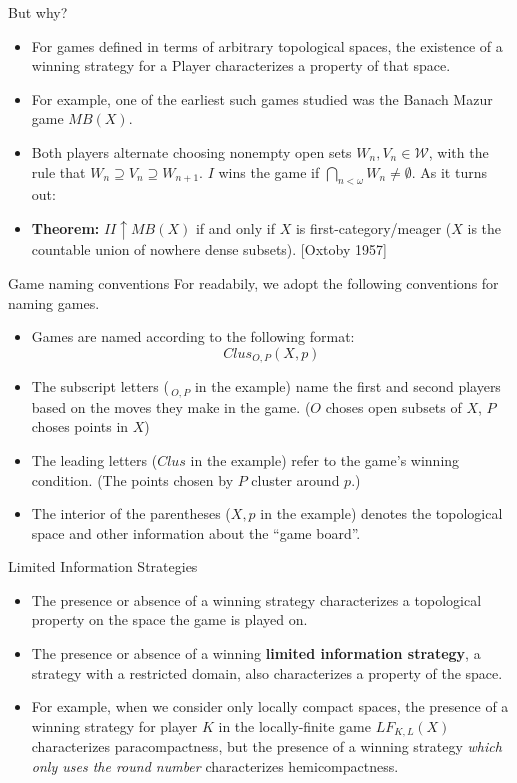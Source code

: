 \documentclass{beamer}
\newcommand{\win}{\uparrow}
\begin{document}
\begin{frame}{But why?}
\begin{itemize}
\item For games defined in terms of arbitrary topological spaces, the existence of a winning strategy for a Player characterizes a property of that space.
\pause
\item For example, one of the earliest such games studied was the Banach Mazur game $MB(X)$.
\pause
\item Both players alternate choosing nonempty open sets $W_n,V_n\in\mathcal{W}$, with the rule that $W_n\supseteq V_n\supseteq W_{n+1}$. $I$ wins the game if $\bigcap_{n<\omega}W_n\not=\emptyset$. As it turns out:
\pause
\item \textbf{Theorem:} $II\win MB(X)$ if and only if $X$ is first-category/meager ($X$ is the countable union of nowhere dense subsets). [Oxtoby 1957]
\end{itemize}
\end{frame}

\begin{frame}{Game naming conventions}
For readabily, we adopt the following conventions for naming games.
  \begin{itemize}
  \item
    Games are named according to the following format: \[Clus_{O,P}(X,p)\]
  \pause
  \item
    The subscript letters ($\,_{O,P}$ in the example) name the first and second players based on the moves they make in the game. ($O$ choses open subsets of $X$, $P$ choses points in $X$)
  \pause
  \item
    The leading letters ($Clus$ in the example) refer to the game's winning condition. (The points chosen by $P$ cluster around $p$.)
  \pause
  \item
    The interior of the parentheses ($X,p$ in the example) denotes the topological space and other information about the ``game board''.
  \end{itemize}
\end{frame}

\begin{frame}{Limited Information Strategies}
  \begin{itemize}
  \item
    The presence or absence of a winning strategy characterizes a topological property on the space the game is played on.
  \pause
  \item
    The presence or absence of a winning \textbf{limited information strategy}, a strategy with a restricted domain, also characterizes a property of the space.
  \pause
  \item
    For example, when we consider only locally compact spaces, the presence of a winning strategy for player $K$ in the locally-finite game $LF_{K,L}(X)$ characterizes paracompactness, but the presence of a winning strategy \textit{which only uses the round number} characterizes hemicompactness.
  \end{itemize}
\end{frame}
\end{document}
